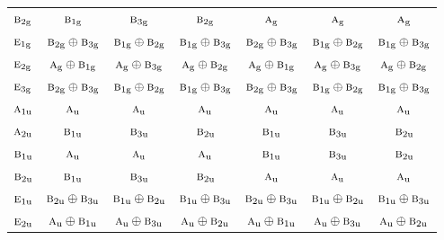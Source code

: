 \documentclass[10pt,a4paper]{article}
\numberwithin{equation}{section}
\newcommand{\irr}[1]{\text{\normalfont\scshape #1}}
\newcommand{\ptag}[1]{\mathrm{#1}}
\begin{document}
{\begin{longtable}{@{}lcccccc@{}}
$\irr{b}_{2\ptag{g}}$ & $\irr{b}_{1\ptag{g}}$ & $\irr{b}_{3\ptag{g}}$ & $\irr{b}_{2\ptag{g}}$ & $\irr{a}_{\ptag{g}}$ & $\irr{a}_{\ptag{g}}$ & $\irr{a}_{\ptag{g}}$\\
$\irr{e}_{1\ptag{g}}$ & $\irr{b}_{2\ptag{g}}\oplus \irr{b}_{3\ptag{g}}$ & $\irr{b}_{1\ptag{g}}\oplus \irr{b}_{2\ptag{g}}$ & $\irr{b}_{1\ptag{g}}\oplus \irr{b}_{3\ptag{g}}$ & $\irr{b}_{2\ptag{g}}\oplus \irr{b}_{3\ptag{g}}$ & $\irr{b}_{1\ptag{g}}\oplus \irr{b}_{2\ptag{g}}$ & $\irr{b}_{1\ptag{g}}\oplus \irr{b}_{3\ptag{g}}$\\
$\irr{e}_{2\ptag{g}}$ & $\irr{a}_{\ptag{g}}\oplus \irr{b}_{1\ptag{g}}$ & $\irr{a}_{\ptag{g}}\oplus \irr{b}_{3\ptag{g}}$ & $\irr{a}_{\ptag{g}}\oplus \irr{b}_{2\ptag{g}}$ & $\irr{a}_{\ptag{g}}\oplus \irr{b}_{1\ptag{g}}$ & $\irr{a}_{\ptag{g}}\oplus \irr{b}_{3\ptag{g}}$ & $\irr{a}_{\ptag{g}}\oplus \irr{b}_{2\ptag{g}}$\\
$\irr{e}_{3\ptag{g}}$ & $\irr{b}_{2\ptag{g}}\oplus \irr{b}_{3\ptag{g}}$ & $\irr{b}_{1\ptag{g}}\oplus \irr{b}_{2\ptag{g}}$ & $\irr{b}_{1\ptag{g}}\oplus \irr{b}_{3\ptag{g}}$ & $\irr{b}_{2\ptag{g}}\oplus \irr{b}_{3\ptag{g}}$ & $\irr{b}_{1\ptag{g}}\oplus \irr{b}_{2\ptag{g}}$ & $\irr{b}_{1\ptag{g}}\oplus \irr{b}_{3\ptag{g}}$\\
$\irr{a}_{1\ptag{u}}$ & $\irr{a}_{\ptag{u}}$ & $\irr{a}_{\ptag{u}}$ & $\irr{a}_{\ptag{u}}$ & $\irr{a}_{\ptag{u}}$ & $\irr{a}_{\ptag{u}}$ & $\irr{a}_{\ptag{u}}$\\
$\irr{a}_{2\ptag{u}}$ & $\irr{b}_{1\ptag{u}}$ & $\irr{b}_{3\ptag{u}}$ & $\irr{b}_{2\ptag{u}}$ & $\irr{b}_{1\ptag{u}}$ & $\irr{b}_{3\ptag{u}}$ & $\irr{b}_{2\ptag{u}}$\\
$\irr{b}_{1\ptag{u}}$ & $\irr{a}_{\ptag{u}}$ & $\irr{a}_{\ptag{u}}$ & $\irr{a}_{\ptag{u}}$ & $\irr{b}_{1\ptag{u}}$ & $\irr{b}_{3\ptag{u}}$ & $\irr{b}_{2\ptag{u}}$\\
$\irr{b}_{2\ptag{u}}$ & $\irr{b}_{1\ptag{u}}$ & $\irr{b}_{3\ptag{u}}$ & $\irr{b}_{2\ptag{u}}$ & $\irr{a}_{\ptag{u}}$ & $\irr{a}_{\ptag{u}}$ & $\irr{a}_{\ptag{u}}$\\
$\irr{e}_{1\ptag{u}}$ & $\irr{b}_{2\ptag{u}}\oplus \irr{b}_{3\ptag{u}}$ & $\irr{b}_{1\ptag{u}}\oplus \irr{b}_{2\ptag{u}}$ & $\irr{b}_{1\ptag{u}}\oplus \irr{b}_{3\ptag{u}}$ & $\irr{b}_{2\ptag{u}}\oplus \irr{b}_{3\ptag{u}}$ & $\irr{b}_{1\ptag{u}}\oplus \irr{b}_{2\ptag{u}}$ & $\irr{b}_{1\ptag{u}}\oplus \irr{b}_{3\ptag{u}}$\\
$\irr{e}_{2\ptag{u}}$ & $\irr{a}_{\ptag{u}}\oplus \irr{b}_{1\ptag{u}}$ & $\irr{a}_{\ptag{u}}\oplus \irr{b}_{3\ptag{u}}$ & $\irr{a}_{\ptag{u}}\oplus \irr{b}_{2\ptag{u}}$ & $\irr{a}_{\ptag{u}}\oplus \irr{b}_{1\ptag{u}}$ & $\irr{a}_{\ptag{u}}\oplus \irr{b}_{3\ptag{u}}$ & $\irr{a}_{\ptag{u}}\oplus \irr{b}_{2\ptag{u}}$\\

\end{longtable}}
\end{document}
